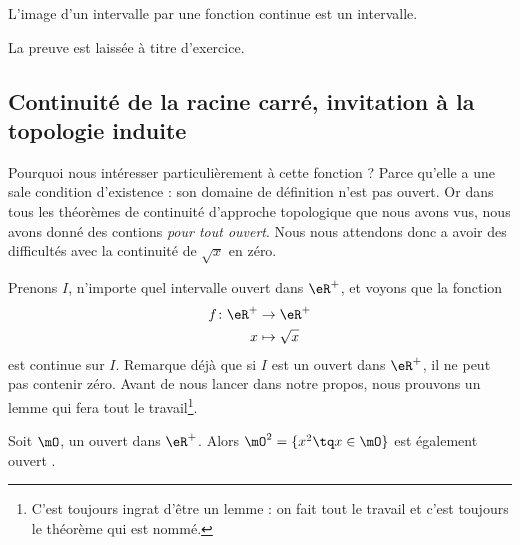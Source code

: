 \begin{corollary}       \label{CorImInterInter}
L'image d'un intervalle par une fonction continue est un intervalle.
\end{corollary}
La preuve est laissée à titre d'exercice.

\subsection{Continuité de la racine carré, invitation à la topologie induite}

Pourquoi nous intéresser particulièrement à cette fonction ? Parce qu'elle a une sale condition d'existence : son domaine de définition n'est pas ouvert. Or dans tous les théorèmes de continuité d'approche topologique que nous avons vus, nous avons donné des contions \emph{pour tout ouvert}. Nous nous attendons donc a avoir des difficultés avec la continuité de $\sqrt{x}$ en zéro.

Prenons $I$, n'importe quel intervalle ouvert dans $\eR^+$, et voyons que la fonction
\begin{equation}
\begin{aligned}
 f\colon \eR^+&\to \eR^+ \\ 
   x&\mapsto \sqrt{x} 
\end{aligned}
\end{equation}
est continue sur $I$. Remarque déjà que si $I$ est un ouvert dans $\eR^+$, il ne peut pas contenir zéro. Avant de nous lancer dans notre propos, nous prouvons un lemme qui fera tout le travail\footnote{C'est toujours ingrat d'être un lemme : on fait tout le travail et c'est toujours le théorème qui est nommé.}.

\begin{lemma}
Soit $\mO$, un ouvert dans $\eR^+$. Alors $\mO^2=\{ x^2\tq x\in\mO \}$ est également ouvert .
\end{lemma}

